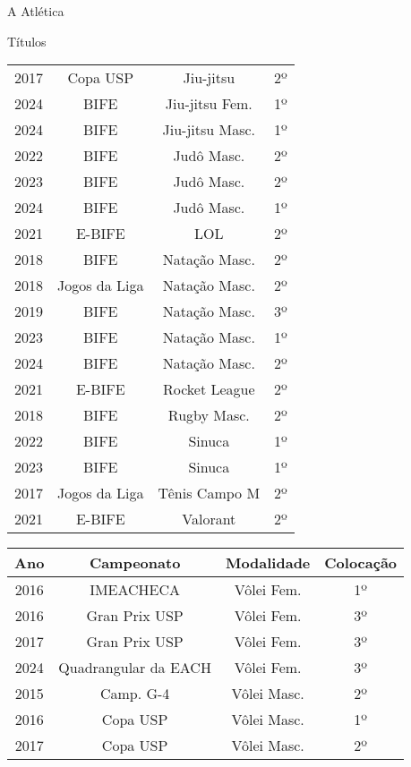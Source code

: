 \begin{secao}{A Atlética}
\begin{subsecao}{Títulos}
\begin{center}
\begin{tabular}{|c|c|c|c|}
    2017 & Copa USP       & Jiu-jitsu       & 2º\\
    2024 & BIFE           & Jiu-jitsu Fem.  & 1º\\
    2024 & BIFE           & Jiu-jitsu Masc. & 1º\\
    2022 & BIFE           & Judô Masc.      & 2º\\
    2023 & BIFE           & Judô Masc.      & 2º\\
    2024 & BIFE           & Judô Masc.      & 1º\\
    2021 & E-BIFE         & LOL             & 2º\\
    2018 & BIFE           & Natação Masc.   & 2º\\
    2018 & Jogos da Liga  & Natação Masc.   & 2º\\
    2019 & BIFE           & Natação Masc.   & 3º\\
    2023 & BIFE           & Natação Masc.   & 1º\\
    2024 & BIFE           & Natação Masc.   & 2º\\
    2021 & E-BIFE         & Rocket League   & 2º\\
    2018 & BIFE           & Rugby Masc.     & 2º\\
    2022 & BIFE           & Sinuca          & 1º\\
    2023 & BIFE           & Sinuca          & 1º\\
    2017 & Jogos da Liga  & Tênis Campo M   & 2º\\
    2021 & E-BIFE         & Valorant        & 2º\\
    \hline
         \end{tabular}
\end{center}
\begin{center}
\begin{tabular}{|c|c|c|c|}
  \hline
  Ano & Campeonato & Modalidade & Colocação\\
  \hline
    2016 & IMEACHECA      & Vôlei Fem.      & 1º\\
    2016 & Gran Prix USP  & Vôlei Fem.      & 3º\\
    2017 & Gran Prix USP  & Vôlei Fem.      & 3º\\
    2024 & Quadrangular da EACH & Vôlei Fem. & 3º\\
    2015 & Camp. G-4      & Vôlei Masc.     & 2º\\
    2016 & Copa USP       & Vôlei Masc.     & 1º\\
    2017 & Copa USP       & Vôlei Masc.     & 2º\\

\end{tabular}
\end{center}
\end{subsecao}
\end{secao}
